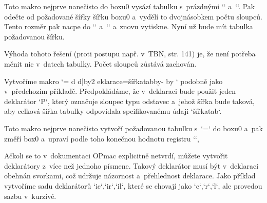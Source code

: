 \begtt
\newdimen\tabw 
\def\countcols#1{\ifx#1\relax\else 
   \ifx#1|\else\advance\tmpnum by2 \fi \expandafter\countcols \fi} 
\def\tableto#1#2#3{{\def\tabiteml{}\def\tabitemr{}\setbox0=\table{#2}{#3}%
   \tmpnum=0 \countcols#2\relax \tabw=#1\advance\tabw by-\wd0 \divide\tabw by\tmpnum 
   \def\tabiteml{\kern\tabw}\def\tabitemr{\kern\tabw}\table{#2}{#3}}} 
\endtt


Toto makro nejprve nanečisto do boxu0 vysází tabulku s~prázdnými `\tabiteml` a~`\tabitemr`. Pak odečte od požadované šířky šířku boxu0 a~vydělí to dvojnásobkem počtu sloupců. Tento rozměr pak nacpe do `\tabiteml` a~`\tabitemr` a~znovu vytiskne. Nyní už bude mít tabulka požadovanou šířku. 



Výhoda tohoto řešení (proti postupu např. v~TBN, str. 141) je, že není potřeba měnit nic v~datech tabulky. Počet sloupců zůstává zachován. 


 


Vytvoříme makro `\tableto{šířkatab}{deklarace}{data}` podobně jako v~předchozím příkladě. Předpokládáme, že v~deklaraci bude použit jeden deklarátor `P`, který označuje sloupec typu odstavec a~jehož šířka bude taková, aby celková šířka tabulky odpovídala spcifikovanému údaji `{šířkatab}`. 

\begtt
\newdimen\Pwidth  \newdimen\tabw 
\def\tabdeclareP {\tabiteml\vtop{\hsize=\Pwidth \rightskip=0pt plus1fil 
   \baselineskip=1.2em \lineskiplimit=0pt 
   \noindent ##\unsskip\vbox to0pt{\vss\hbox{\tabstrutA}}}\hss\tabitemr} 
\def\tableto#1#2#3{{\Pwidth=.5\hsize \setbox0=\table{#2}{#3} 
   \tabw=#1\relax \advance\tabw by-\wd0 \advance\Pwidth by\tabw \table{#2}{#3}}} 
\endtt


Toto makro nejprve nanečisto vytvoří požadovanou tabulku s~`\Pwidth=\hsize` do boxu0 a~pak změří box0 a~upraví podle toho konečnou hodnotu registru `\Pwidth`, 


 


Ačkoli se to v~dokumentaci OPmac explicitně netvrdí, můžete vytvořit deklarátory z~více než jednoho písmene. Takový deklarátor musí být v~deklaraci obehnán svorkami, což udržuje názornost a~přehlednost deklarace. Jako příklad vytvoříme sadu deklarátorů `ic`,`ir`,`il`, které se chovají jako `c`,`r`,`l`, ale provedou sazbu v~kurzívě. 


